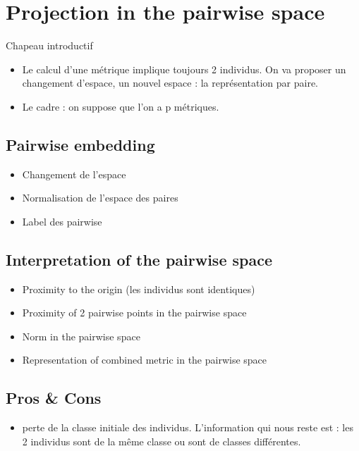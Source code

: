 \chapter{Projection in the pairwise space}
\label{sec:unchapitre}
\minitoc


\noindent Chapeau introductif
\begin{itemize}
	\item Le calcul d'une métrique implique toujours 2 individus. On va proposer un changement d'espace, un nouvel espace : la représentation par paire.
	\item Le cadre : on suppose que l'on a p métriques.
\end{itemize}

\section{Pairwise embedding}
\begin{itemize}
	\item Changement de l'espace
	\item Normalisation de l'espace des paires
	\item Label des pairwise
\end{itemize}


\section{Interpretation of the pairwise space}
\begin{itemize}
	\item Proximity to the origin (les individus sont identiques)
	\item Proximity of 2 pairwise points in the pairwise space 
	\item Norm in the pairwise space
	\item Representation of combined metric in the pairwise space
\end{itemize}

\section{Pros \& Cons}
\begin{itemize}
	\item perte de la classe initiale des individus. L'information qui nous reste est : les 2 individus sont de la même classe ou sont de classes différentes.
\end{itemize}